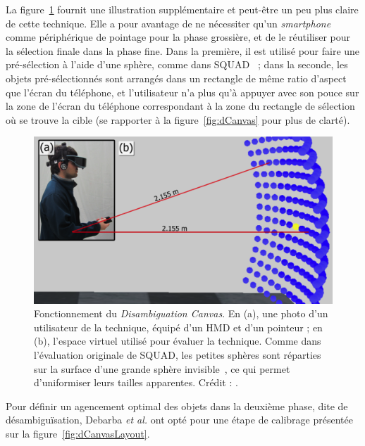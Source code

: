 	La figure~\ref{fig:dCanvas2} fournit une illustration supplémentaire et peut-être un peu plus claire de cette technique. Elle a pour avantage de ne nécessiter qu'un \emph{smartphone} comme périphérique de pointage pour la phase grossière, et de le réutiliser pour la sélection finale dans la phase fine. Dans la première, il est utilisé pour faire une pré-sélection à l'aide d'une sphère, comme dans SQUAD~\cite{kopper2011rapid} ; dans la seconde, les objets pré-sélectionnés sont arrangés dans un rectangle de même ratio d'aspect que l'écran du téléphone, et l'utilisateur n'a plus qu'à appuyer avec son pouce sur la zone de l'écran du téléphone correspondant à la zone du rectangle de sélection où se trouve la cible (se rapporter à la figure~\ref{fig:dCanvas} pour plus de clarté).
	
	\begin{figure}[H]
		\centering
		\includegraphics[width=\textwidth]{figures/ch2/dCanvas2}
		\caption[\emph{Disambiguation Canvas}, bis]{Fonctionnement du \emph{Disambiguation Canvas}. En (a), une photo d'un utilisateur de la technique, équipé d'un HMD et d'un pointeur ; en (b), l'espace virtuel utilisé pour évaluer la technique. Comme dans l'évaluation originale de SQUAD, les petites sphères sont réparties sur la surface d'une grande sphère invisible~\cite{kopper2011rapid}, ce qui permet d'uniformiser leurs tailles apparentes. Crédit : \cite{debarba2013disambiguation}.}
		\label{fig:dCanvas2}
	\end{figure}
	
	Pour définir un agencement optimal des objets dans la deuxième phase, dite de désambiguïsation, Debarba \emph{et al.} ont opté pour une étape de calibrage présentée sur la figure~\ref{fig:dCanvasLayout}.
	
